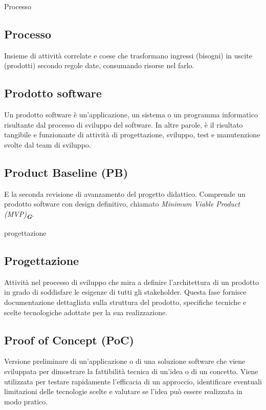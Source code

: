 \hypertarget{sec:processo}{Processo}
\subsection*{Processo}
Insieme di attività correlate e coese che trasformano ingressi (bisogni) in uscite (prodotti) secondo regole date,
consumando risorse nel farlo.

\hypertarget{sec:prodotto_software}{}
\subsection*{Prodotto software}
Un prodotto software è un’applicazione, un sistema o un programma
informatico risultante dal processo di sviluppo del software. In altre parole, è il risultato
tangibile e funzionante di attività di progettazione, sviluppo, test e manutenzione svolte dal
team di sviluppo.

\hypertarget{sec:PB}{}
\subsection*{Product Baseline (PB)}
E la seconda revisione di avanzamento del progetto didattico. Comprende un prodotto software con design definitivo, 
chiamato \emph{Minimum Viable Product (MVP)}\textsubscript{\textit{\textbf{G}}}.

\hypertarget{sec:progettazione}{progettazione}
\subsection*{Progettazione}
Attività nel processo di sviluppo che mira a definire l'architettura di un prodotto in grado di soddisfare le esigenze di tutti gli stakeholder. 
Questa fase fornisce documentazione dettagliata sulla struttura del prodotto, specifiche tecniche e scelte tecnologiche adottate per la sua realizzazione.

\hypertarget{sec:PoC}{}
\subsection*{Proof of Concept (PoC)}
Versione preliminare di un’applicazione o di una soluzione software che viene sviluppata per dimostrare la fattibilità tecnica di un’idea o di un concetto. 
Viene utilizzata per testare rapidamente l’efficacia di un approccio, identificare eventuali limitazioni delle tecnologie scelte e valutare se l’idea può 
essere realizzata in modo pratico.

\hypertarget{sec:proponente}{}
